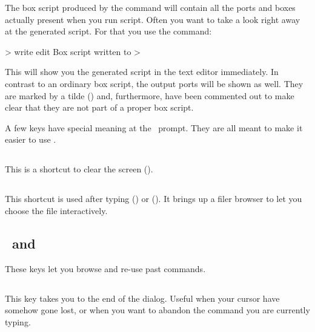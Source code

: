 The box script produced by the  command will contain all the ports and boxes actually present when you run script. Often you want to take a look right away at the generated script. For that you use the  command:

\begin{usdialog}
> write edit
Box script written to %
> 
\end{usdialog}

This will show you the generated script in the text editor immediately. In contrast to an ordinary box script, the output ports will be shown as well. They are marked by a tilde (\mytilde) and, furthermore, have been commented out to make clear that they are not part of a proper box script.


A few keys have special meaning at the \US\ prompt. They are all meant to make it easier to use \US.

\subsection{}
This is a shortcut to clear the screen ().

\subsection{\autofillkey}
This shortcut is used after typing  () or  (). It brings up a filer browser to let you choose the file interactively.

\subsection{\upkey\ and \downkey}
These keys let you browse and re-use past commands.

\subsection{\esckey}
This key takes you to the end of the dialog. Useful when your cursor have somehow gone lost, or when you want to abandon the command you are currently typing.
